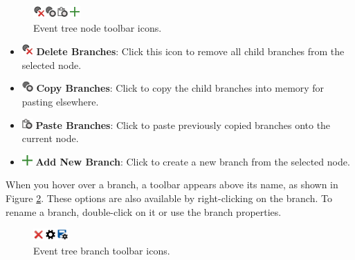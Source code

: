 \documentclass[
]{book}
\begin{document}
\begin{figure}

{\centering \includegraphics{images/figure86} 

}

\caption{Event tree node toolbar icons.}\label{fig:figure-86}
\end{figure}

\begin{itemize}
\item
  \includegraphics{images/deletebranches.png} \textbf{Delete Branches}: Click this icon to remove all child branches from the selected node.
\item
  \includegraphics{images/copybranches.png} \textbf{Copy Branches}: Click to copy the child branches into memory for pasting elsewhere.
\item
  \includegraphics{images/pastebranches.png} \textbf{Paste Branches}: Click to paste previously copied branches onto the current node.
\item
  \includegraphics{images/newbranch.png} \textbf{Add New Branch}: Click to create a new branch from the selected node.
\end{itemize}

When you hover over a branch, a toolbar appears above its name, as shown in Figure \ref{fig:figure-87}. These options are also available by right-clicking on the branch. To rename a branch, double-click on it or use the branch properties.

\begin{figure}

{\centering \includegraphics{images/figure87} 

}

\caption{Event tree branch toolbar icons.}\label{fig:figure-87}
\end{figure}
\end{document}
